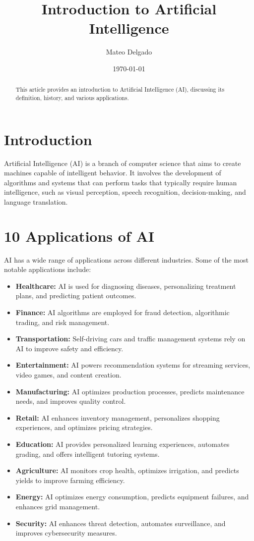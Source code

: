 \documentclass{article}
\begin{document}
\title{Introduction to Artificial Intelligence}
\author{Mateo Delgado}
\date{\today}
\maketitle

\begin{abstract}
This article provides an introduction to Artificial Intelligence (AI), discussing its definition, history, and various applications.
\end{abstract}

\section{Introduction}
Artificial Intelligence (AI) is a branch of computer science that aims to create machines capable of intelligent behavior. It involves the development of algorithms and systems that can perform tasks that typically require human intelligence, such as visual perception, speech recognition, decision-making, and language translation.

\section{10 Applications of AI}
AI has a wide range of applications across different industries. Some of the most notable applications include:

\begin{itemize}
    \item \textbf{Healthcare:} AI is used for diagnosing diseases, personalizing treatment plans, and predicting patient outcomes.
    \item \textbf{Finance:} AI algorithms are employed for fraud detection, algorithmic trading, and risk management.
    \item \textbf{Transportation:} Self-driving cars and traffic management systems rely on AI to improve safety and efficiency.
    \item \textbf{Entertainment:} AI powers recommendation systems for streaming services, video games, and content creation.
    \item \textbf{Manufacturing:} AI optimizes production processes, predicts maintenance needs, and improves quality control.
    \item \textbf{Retail:} AI enhances inventory management, personalizes shopping experiences, and optimizes pricing strategies.
    \item \textbf{Education:} AI provides personalized learning experiences, automates grading, and offers intelligent tutoring systems.
    \item \textbf{Agriculture:} AI monitors crop health, optimizes irrigation, and predicts yields to improve farming efficiency.
    \item \textbf{Energy:} AI optimizes energy consumption, predicts equipment failures, and enhances grid management.
    \item \textbf{Security:} AI enhances threat detection, automates surveillance, and improves cybersecurity measures.
\end{itemize}
\end{document}

